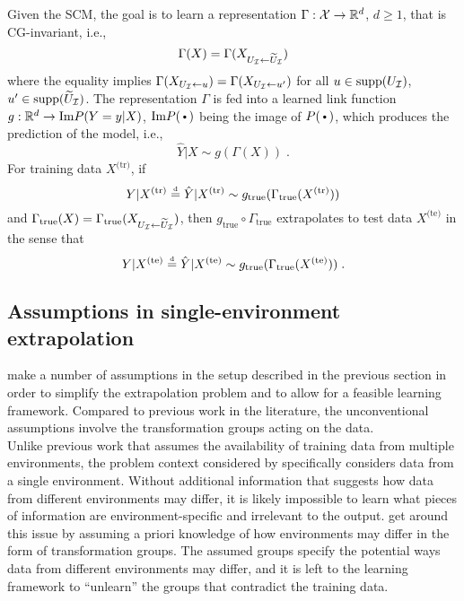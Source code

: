 Given the SCM, the goal is to learn a representation $\Gamma:\mathcal{X}\rightarrow\mathbb{R}^d$, $d\geq 1$, that is CG-invariant, i.e.,
\[
\Gamma(X) = \Gamma(X_{U_{\mathcal{I}}\leftarrow\widetilde{U}_{\mathcal{I}}})
\]
where the equality implies $\Gamma(X_{U_{\mathcal{I}}\leftarrow u})=\Gamma(X_{U_{\mathcal{I}}\leftarrow u'})$ for all $u\in\text{\rm supp}(U_{\mathcal{I}})$, $u'\in\text{\rm supp}(\widetilde{U}_{\mathcal{I}})$. The representation $\Gamma$ is fed into a learned link function $g:\mathbb{R}^d\rightarrow \text{Im} P(Y=y|X)$, $\text{Im} P(\argdot)$ being the image of $P(\argdot)$, which produces the prediction of the model, i.e.,
\[
\hat{Y}|X \sim g(\Gamma(X)) \;.
\]
For training data $X^\text{(tr)}$, if
\[
Y|X^\text{(tr)} \stackrel{\text{\rm\tiny d}}{=} \hat{Y}|X^\text{(tr)}\sim g_{\text{true}}(\Gamma_{\text{true}}(X^\text{(tr)}))
\]
and $\Gamma_\text{true}(X) = \Gamma_\text{true}(X_{U_{\mathcal{I}}\leftarrow\widetilde{U}_{\mathcal{I}}})$, then $g_\text{true}\circ\Gamma_\text{true}$ extrapolates to test data $X^\text{(te)}$ in the sense that
\[
Y|X^\text{(te)} \stackrel{\text{\rm\tiny d}}{=} \hat{Y}|X^\text{(te)}\sim g_{\text{true}}(\Gamma_{\text{true}}(X^\text{(te)})) \;.
\]


\subsection{Assumptions in single-environment extrapolation}

\textcite{Mouli:2021} make a number of assumptions in the setup described in the previous section in order to simplify the extrapolation problem and to allow for a feasible learning framework. Compared to previous work in the literature, the unconventional assumptions involve the transformation groups acting on the data.
\\

Unlike previous work that assumes the availability of training data from multiple environments, the problem context considered by \citeauthor{Mouli:2021} specifically considers data from a single environment. Without additional information that suggests how data from different environments may differ, it is likely impossible to learn what pieces of information are environment-specific and irrelevant to the output. \citeauthor{Mouli:2021} get around this issue by assuming a priori knowledge of how environments may differ in the form of transformation groups. The assumed groups specify the potential ways data from different environments may differ, and it is left to the learning framework to ``unlearn'' the groups that contradict the training data.
\\

